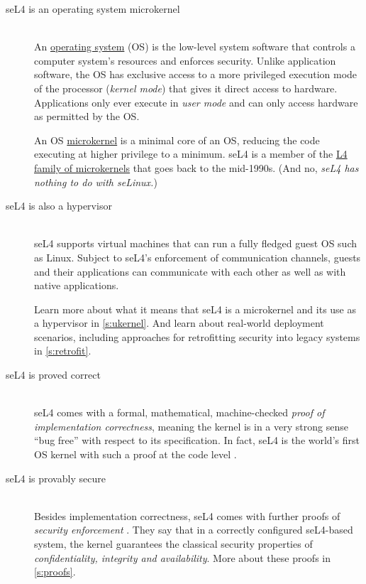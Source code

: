\documentclass[english,a4paper,12pt]{report}
\newcommand{\Break}{\ \nopagebreak\\}
\begin{document}
  \begin{description}
  \item[seL4 is an operating system microkernel]\Break
    An \href{https://en.wikipedia.org/wiki/Operating_system}{operating
      system} (OS) is the low-level system software that controls a
    computer system's resources and enforces security. Unlike
    application software, the OS has
    exclusive access to a more privileged execution mode of the processor (\emph{kernel mode})
    that gives it direct access to hardware. Applications only ever
    execute in
    \emph{user mode} and can only access hardware as permitted by the
    OS.

    An OS
    \href{https://en.wikipedia.org/wiki/Microkernel}{microkernel} is a
    minimal core of an OS, reducing the code executing at higher
    privilege to a minimum. seL4 is a member of the
    \href{https://en.wikipedia.org/wiki/L4_microkernel_family}{L4
      family of microkernels} that goes back to the mid-1990s.
    (And no, \emph{seL4 has nothing to do with seLinux.})

  \item[seL4 is also a hypervisor] \Break
    seL4 supports virtual machines that can run a fully fledged guest OS
    such as Linux. Subject to seL4's enforcement of communication
    channels,  guests and their applications can communicate with
    each other as well as with native applications.

   Learn  more about what it means that seL4 is a microkernel and its use as
    a hypervisor in \autoref{s:ukernel}. And learn about real-world
    deployment scenarios, including approaches for retrofitting security into
    legacy systems in \autoref{s:retrofit}.

  \item[seL4 is proved correct]\Break
    seL4 comes with a formal, mathematical, machine-checked
    \emph{proof of implementation correctness}, meaning the kernel is
    in a very strong sense ``bug free'' with respect to its specification.
    In fact, seL4 is the world's
    first OS kernel with such a proof at the code level
    \citep{Klein_EHACDEEKNSTW_09}.

  \item[seL4 is provably secure]\Break
    Besides implementation correctness, seL4 comes with further proofs of
    \emph{security enforcement} \citep{Klein_AEMSKH_14}. They say that
    in a correctly configured seL4-based system,  the kernel
    guarantees the classical security properties of
    \emph{confidentiality, integrity and availability}. More about
    these proofs in \autoref{s:proofs}.


\end{description}
\end{document}
